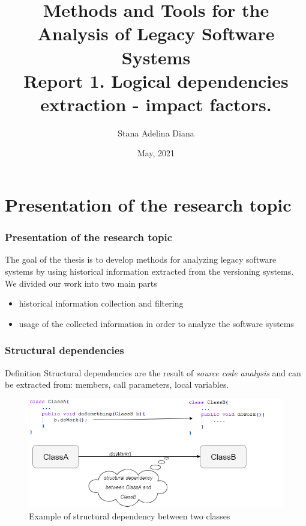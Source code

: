 \documentclass{beamer}
\title[Pres]{Methods and Tools for the Analysis of Legacy Software
Systems\\
Report 1. Logical dependencies extraction - impact factors.
 }
\author{Stana Adelina Diana}
\institute{Computer Science and Engineering Department\\
"Politehnica" University of Timisoara}
\date{May, 2021}
\begin{document}
\begin{frame}
  \titlepage
\end{frame}

\section{Presentation of the research topic}
 \begin{frame}
\frametitle{Presentation of the research topic}
The goal of the thesis is to develop methods for analyzing legacy software systems by using historical information extracted from the versioning systems.
We divided our work into two main parts

\begin{itemize}
\item historical information collection and filtering
\item usage of the collected information in order to analyze the software systems
\end{itemize}

\end{frame}


 \begin{frame}
\frametitle{Structural dependencies}
\begin{block}{Definition}
Structural dependencies are the result of \textit{source code analysis} and can be extracted from: members, call parameters, local variables. 
\end{block}

\begin{center}
     \begin{figure}
	\includegraphics[width=\textwidth]{structural_dep.png}
	\caption{\label{fig:fig}Example of structural dependency between two classes}
     \end{figure}
\end{center}

\end{frame}
\end{document}
